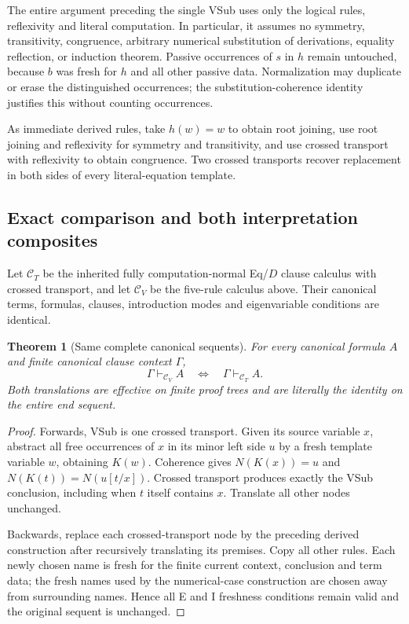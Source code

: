 \documentclass[11pt]{article}
\newtheorem{theorem}{Theorem}[section]
\theoremstyle{definition}
\theoremstyle{remark}
\begin{document}
The entire argument preceding the single VSub uses only the logical
rules, reflexivity and literal computation. In particular, it assumes
no symmetry, transitivity, congruence, arbitrary numerical substitution
of derivations, equality reflection, or induction theorem. Passive
occurrences of $s$ in $h$ remain untouched, because $b$ was fresh for
$h$ and all other passive data. Normalization may duplicate or erase
the distinguished occurrences; the substitution-coherence identity
justifies this without counting occurrences.

As immediate derived rules, take $h(w)=w$ to obtain root joining,
use root joining and reflexivity for symmetry and transitivity, and
use crossed transport with reflexivity to obtain congruence. Two
crossed transports recover replacement in both sides of every
literal-equation template.

\subsection{Exact comparison and both interpretation composites}

Let $\mathcal C_T$ be the inherited fully computation-normal Eq/$D$
clause calculus with crossed transport, and let $\mathcal C_V$ be the
five-rule calculus above. Their canonical terms, formulas, clauses,
introduction modes and eigenvariable conditions are identical.

\begin{theorem}[Same complete canonical sequents]
For every canonical formula $A$ and finite canonical clause context
$\Gamma$,
\[
       \Gamma\vdash_{\mathcal C_V}A
       \quad\Longleftrightarrow\quad
       \Gamma\vdash_{\mathcal C_T}A.
\]
Both translations are effective on finite proof trees and are literally
the identity on the entire end sequent.
\end{theorem}
\begin{proof}
Forwards, VSub is one crossed transport. Given its source variable $x$,
abstract all free occurrences of $x$ in its minor left side $u$ by a
fresh template variable $w$, obtaining $K(w)$. Coherence gives
$N(K(x))=u$ and $N(K(t))=N(u[t/x])$. Crossed transport produces
exactly the VSub conclusion, including when $t$ itself contains $x$.
Translate all other nodes unchanged.

Backwards, replace each crossed-transport node by the preceding
derived construction after recursively translating its premises. Copy
all other rules. Each newly chosen name is fresh for the finite current
context, conclusion and term data; the fresh names used by the numerical-case construction are chosen
away from surrounding names. Hence all E and I
freshness conditions remain valid and the original sequent is unchanged.
\end{proof}
\end{document}
